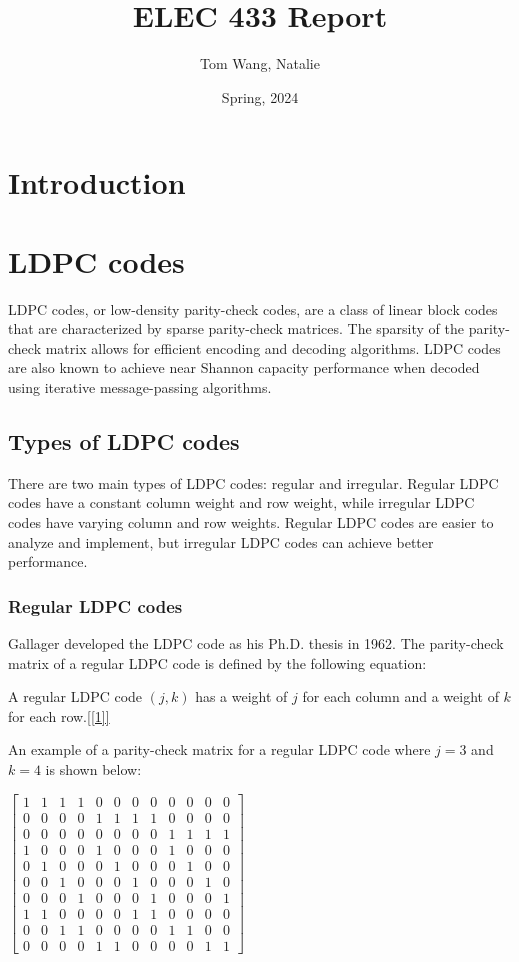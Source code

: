 \documentclass[letterpaper,12pt,oneside]{article}
\title{ELEC 433 Report}
\author{Tom Wang, Natalie}
\date{Spring, 2024}
\begin{document}
\maketitle
\section{Introduction}
\section{LDPC codes}
LDPC codes, or low-density parity-check codes, are a class of linear block codes that are characterized by sparse parity-check matrices. The sparsity of the parity-check matrix allows for efficient encoding and decoding algorithms. LDPC codes are also known to achieve near Shannon capacity performance when decoded using iterative message-passing algorithms.
\subsection{Types of LDPC codes}
There are two main types of LDPC codes: regular and irregular. Regular LDPC codes have a constant column weight and row weight, while irregular LDPC codes have varying column and row weights. Regular LDPC codes are easier to analyze and implement, but irregular LDPC codes can achieve better performance.

\subsubsection{Regular LDPC codes}
Gallager developed the LDPC code as his Ph.D. thesis in 1962. The parity-check matrix of a regular LDPC code is defined by the following equation:

A regular LDPC code $(j,k)$ has a weight of $j$ for each column and a weight of $k$ for each row.\ref{[1]} 

An example of a parity-check matrix for a regular LDPC code where $j=3$ and $k=4$ is shown below:

$\begin{bmatrix}
    1 & 1 & 1 & 1 & 0 & 0 & 0 & 0 & 0 & 0 & 0 & 0\\
    0 & 0 & 0 & 0 & 1 & 1 & 1 & 1 & 0 & 0 & 0 & 0\\
    0 & 0 & 0 & 0 & 0 & 0 & 0 & 0 & 1 & 1 & 1 & 1\\
    1 & 0 & 0 & 0 & 1 & 0 & 0 & 0 & 1 & 0 & 0 & 0\\
    0 & 1 & 0 & 0 & 0 & 1 & 0 & 0 & 0 & 1 & 0 & 0\\
    0 & 0 & 1 & 0 & 0 & 0 & 1 & 0 & 0 & 0 & 1 & 0\\
    0 & 0 & 0 & 1 & 0 & 0 & 0 & 1 & 0 & 0 & 0 & 1\\
    1 & 1 & 0 & 0 & 0 & 0 & 1 & 1 & 0 & 0 & 0 & 0\\
    0 & 0 & 1 & 1 & 0 & 0 & 0 & 0 & 1 & 1 & 0 & 0\\
    0 & 0 & 0 & 0 & 1 & 1 & 0 & 0 & 0 & 0 & 1 & 1
\end{bmatrix}$
\end{document}
